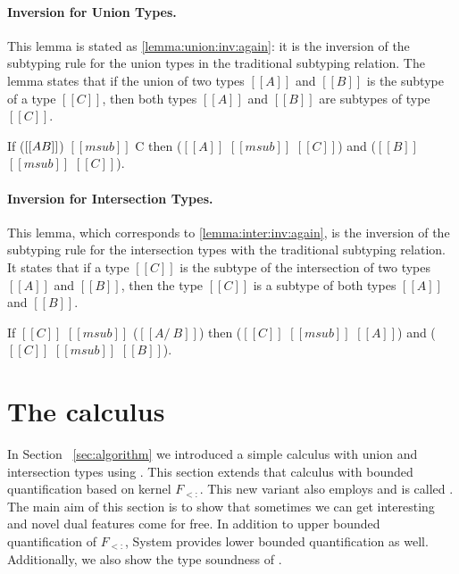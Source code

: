 \paragraph{Inversion for Union Types.}
This lemma is stated as \cref{lemma:union:inv:again}:
it is the inversion of the subtyping rule for the union types in the traditional subtyping relation.
The lemma states that if the union of two types $[[A]]$ and $[[B]]$ is the subtype of a type $[[C]]$, then both types $[[A]]$ and $[[B]]$ are subtypes of type $[[C]]$.

\begin{lemma}
  \label{lemma:union:inv:again}
 If ($[[A \/  B]]$) $[[msub]]$ C then ($[[A]]$ $[[msub]]$ $[[C]]$) and  ($[[B]]$ $[[msub]]$ $[[C]]$).
\end{lemma}

\paragraph{Inversion for Intersection Types.}
This lemma, which corresponds to \cref{lemma:inter:inv:again},
is the inversion of the subtyping rule for the intersection types with
the traditional subtyping relation.
It states that if a type $[[C]]$ is the subtype of the intersection of two
types $[[A]]$ and $[[B]]$, then the type $[[C]]$ is a subtype of both types $[[A]]$ and $[[B]]$.

\begin{lemma}
  \label{lemma:inter:inv:again}
  If $[[C]]$ $[[msub]]$ ($[[A /\  B]]$) then ($[[C]]$ $[[msub]]$ $[[A]]$) and  ($[[C]]$ $[[msub]]$ $[[B]]$).
\end{lemma}









\section{The \gfskiu calculus}
\label{sec:system-dkfs}

In Section ~\ref{sec:algorithm} we introduced a simple calculus with
union and intersection types using \nameduo.  This section extends that
calculus with bounded quantification based on kernel $F_{<:}$. This
new variant also employs \nameduo and is called \gfskiu.  The main
aim of this section is to show that sometimes we can get interesting
and novel dual features come for free.  In addition to upper bounded
quantification of $F_{<:}$, System \gfskiu provides lower bounded
quantification as well.  Additionally, we also show the type
soundness of \gfskiu.

